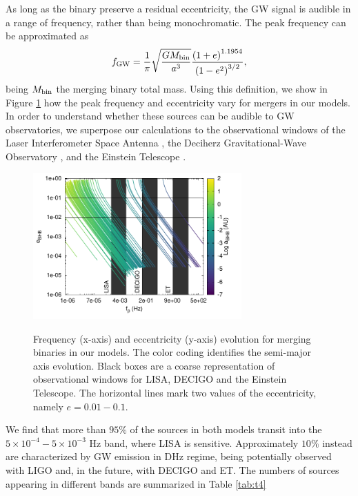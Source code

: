 \documentclass[useAMS,usenatbib]{mn2e}
\newcommand{\gw}{{\rm GW}}
\begin{document}
As long as the binary preserve a residual eccentricity, the GW signal is audible in a range of frequency, rather than being monochromatic. The peak frequency can be approximated as \citep{wen03, antonini12}
\begin{equation}
f_\gw = \frac{1}{\pi}\sqrt{\frac{GM_{\rm bin}}{a^3}}\frac{\left(1+e\right)^{1.1954}}{\left(1-e^2\right)^{3/2}},
\end{equation}  
being $M_{\rm bin}$ the merging binary total mass. Using this definition, we show in Figure \ref{F10} how the peak frequency and eccentricity vary for mergers in our models. In order to understand whether these sources can be audible to GW observatories, we superpose our calculations to the observational windows of the Laser Interferometer Space Antenna \citep[LISA\footnote{\url{https://www.elisascience.org/}},][]{amaro12}, the Deciherz Gravitational-Wave Observatory \citep[DECIGO\footnote{\url{http://tamago.mtk.nao.ac.jp/spacetime/decigo_e.html}},][]{seto01}, and the Einstein Telescope \citep[ET\footnote{\url{http://www.et-gw.eu/}},][]{punturo10}. 

\begin{figure}
\centering
\includegraphics[width=8cm]{freq_evo}\\
\caption{Frequency (x-axis) and eccentricity (y-axis) evolution for merging binaries in our models. The color coding identifies the semi-major axis evolution. Black boxes are a coarse representation of observational windows for LISA, DECIGO and the Einstein Telescope. The horizontal lines mark two values of the eccentricity, namely $e=0.01-0.1$.}
\label{F10}
\end{figure}

We find that more than $95\%$ of the sources in both models transit into the $5\times 10^{-4} - 5\times 10^{-3}$ Hz band, where LISA is sensitive. Approximately $10\%$ instead are characterized by GW emission in DHz regime, being potentially observed with LIGO and, in the future, with DECIGO and ET.
The numbers of sources appearing in different bands are summarized in Table \ref{tab:t4}
 
\end{document}
